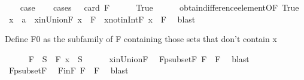 \begin{isabellebody}
\ \ \isamarkupfalse%
\ {\isacharquery}{\kern0pt}case\isanewline
\ \ \isamarkupfalse%
\ {\isacharparenleft}{\kern0pt}cases\ {\isachardoublequoteopen}{}\ {\isasymle}\ card\ F{\isachardoublequoteclose}{\isacharparenright}{\kern0pt}\isanewline
\ \ \ \ \isamarkupfalse%
\ True\isanewline
\ \ \ \ \isamarkupfalse%
\ obtain{\isacharunderscore}{\kern0pt}difference{\isacharunderscore}{\kern0pt}element{\isacharbrackleft}{\kern0pt}OF\ True{\isacharbrackright}{\kern0pt}\ \isamarkupfalse%
\ x\ {\isacharcolon}{\kern0pt}{\isacharcolon}{\kern0pt}\ {\isacharprime}{\kern0pt}a\ \ x{\isacharunderscore}{\kern0pt}in{\isacharunderscore}{\kern0pt}Union{\isacharunderscore}{\kern0pt}F{\isacharcolon}{\kern0pt}\ {\isachardoublequoteopen}x\ {\isasymin}\ {\isasymUnion}F{\isachardoublequoteclose}\ \ x{\isacharunderscore}{\kern0pt}not{\isacharunderscore}{\kern0pt}in{\isacharunderscore}{\kern0pt}Int{\isacharunderscore}{\kern0pt}F{\isacharcolon}{\kern0pt}\ {\isachardoublequoteopen}x\ {\isasymnotin}\ {\isasymInter}F{\isachardoublequoteclose}\ \isamarkupfalse%
\ blast%
\begin{isamarkuptext}%
Define F0 as the subfamily of F containing those sets that don't contain x%
\end{isamarkuptext}\isamarkuptrue%
\ \ \ \ \isamarkupfalse%
\ {\isacharquery}{\kern0pt}F{}\ {\isacharequal}{\kern0pt}\ {\isachardoublequoteopen}{\isacharbraceleft}{\kern0pt}S\ {\isasymin}\ F{\isachardot}{\kern0pt}\ x\ {\isasymnotin}\ S{\isacharbraceright}{\kern0pt}{\isachardoublequoteclose}\isanewline
\ \ \ \ \isamarkupfalse%
\ x{\isacharunderscore}{\kern0pt}in{\isacharunderscore}{\kern0pt}Union{\isacharunderscore}{\kern0pt}F\ \isamarkupfalse%
\ F{}{\isacharunderscore}{\kern0pt}psubset{\isacharunderscore}{\kern0pt}F{\isacharcolon}{\kern0pt}\ {\isachardoublequoteopen}{\isacharquery}{\kern0pt}F{}\ {\isasymsubset}\ F{\isachardoublequoteclose}\ \isamarkupfalse%
\ blast\isanewline
\ \ \ \ \isamarkupfalse%
\ F{}{\isacharunderscore}{\kern0pt}psubset{\isacharunderscore}{\kern0pt}F\ \isamarkupfalse%
\ F{}{\isacharunderscore}{\kern0pt}in{\isacharunderscore}{\kern0pt}F{\isacharcolon}{\kern0pt}\ {\isachardoublequoteopen}{\isacharquery}{\kern0pt}F{}\ {\isasymsubseteq}\ F{\isachardoublequoteclose}\ \isamarkupfalse%
\ blast\isanewline
\ \ \ \ \isamarkupfalse%

\end{isabellebody}
